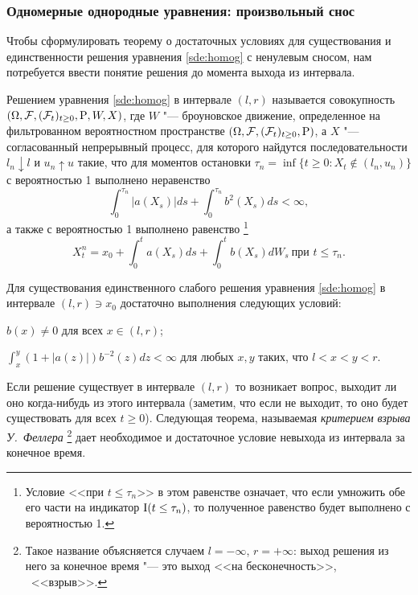 \subsubsection{Одномерные однородные уравнения: произвольный снос}

Чтобы сформулировать теорему о достаточных условиях для существования и единственности решения уравнения \eqref{sde:homog} с ненулевым сносом, нам потребуется ввести понятие решения до момента выхода из интервала.

\begin{definition}
Решением уравнения \eqref{sde:homog} в интервале $(l,r)$ называется совокупность $(\Omega,\mathcal{F},(\mathcal{F}_t)_{t\ge0},\mathrm{P},W,X)$, где $W$ "--- броуновское движение, определенное на фильтрованном вероятностном пространстве $(\Omega,\mathcal{F},(\mathcal{F}_t)_{t\ge0},\mathrm{P})$, а $X$ "--- согласованный непрерывный процесс, для которого найдутся последовательности $l_n\downarrow l$ и $u_n\uparrow u$ такие, что для моментов остановки $\tau_n = \inf\{t\ge0 : X_t \not\in(l_n,u_n)\}$ с вероятностью 1 выполнено неравенство
\[
\int_0^{\tau_n} |a(X_s)|ds + \int_0^{\tau_n} b^2(X_s)ds < \infty,
\]
а также с вероятностью 1 выполнено равенство%
\footnote{Условие <<при $t\le\tau_n$>> в этом равенстве означает, что если умножить обе его части на индикатор $\operatorname{I}(t\le\tau_n)$, то полученное равенство будет выполнено с вероятностью 1.}
\[
X_t^n = x_0 + \int_0^t a(X_s)ds + \int_0^t b(X_s)dW_s\ \text{при $t\le \tau_n$}.
\]
\end{definition}



\begin{theorem}
\label{sde:t:es-2}
Для существования единственного слабого решения уравнения \eqref{sde:homog} в интервале $(l,r)\ni x_0$ достаточно выполнения следующих условий:
\begin{alphenum}
\item $b(x)\neq 0$ для всех $x\in(l,r)$;
\item $\int_x^y (1+|a(z)|)b^{-2}(z) dz <\infty$ для любых $x,y$ таких, что $l<x<y<r$.
\end{alphenum}
\end{theorem}

Если решение существует в интервале $(l,r)$ то возникает вопрос, выходит ли оно когда-нибудь из этого интервала (заметим, что если не выходит, то оно будет существовать для всех $t\ge 0$).
Следующая теорема, называемая \emph{критерием взрыва У.~Феллера}%
\footnote{Такое название объясняется случаем $l=-\infty$, $r=+\infty$: выход решения из него за конечное время "--- это выход <<на бесконечность>>, \te\ <<взрыв>>.}
дает необходимое и достаточное условие невыхода из интервала за конечное время.

